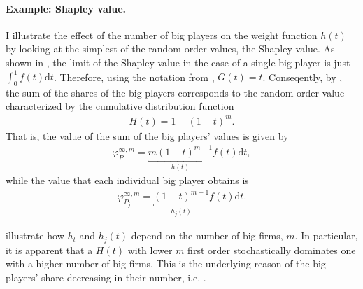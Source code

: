\documentclass[a4paper]{article}
\newcommand{\dt}{\mathrm{d}t}
\begin{document}
\paragraph{Example: Shapley value.}
I illustrate the effect of the number of big players on the weight function $h(t)$ by looking at the simplest of the random order values, the Shapley value.
As shown in , the limit of the Shapley value in the case of a single big player is just $\int_0^1 f(t) \dt$.
Therefore, using the notation from , $G(t) = t$.
Conseqently, by , the sum of the shares of the big players corresponds to the random order value characterized by the cumulative distribution function
\begin{align} 
    H(t) = 1 - (1 - t)^m.  \label{eq:weight_function_shapley}
\end{align}
That is, the value of the sum of the big players' values is given by
\begin{align*}
    \varphi_P^{\infty, m} = \underbracket{m (1-t) ^ {m-1}}_{h(t)} f(t) \dt,
\end{align*}
while the value that each individual big player obtains is
\begin{align*}
    \varphi_{P_j}^{\infty, m} = \underbracket{(1-t) ^ {m-1}}_{h_j(t)} f(t) \dt.
\end{align*}

 illustrate how $h_t$ and $h_j(t)$ depend on the number of big firms, $m$.
In particular, it is apparent that a $H(t)$ with lower $m$ first order stochastically dominates one with a higher number of big firms.
This is the underlying reason of the big players' share decreasing in their number, i.e. .
\end{document}
